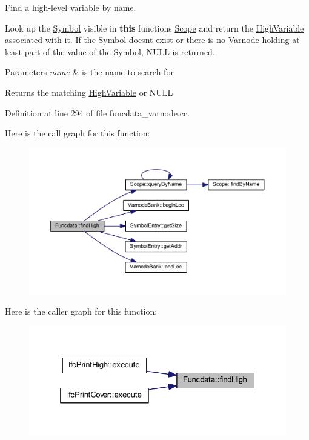 Find a high-\/level variable by name. 

Look up the \mbox{\hyperlink{class_symbol}{Symbol}} visible in {\bfseries{this}} function\textquotesingle{}s \mbox{\hyperlink{class_scope}{Scope}} and return the \mbox{\hyperlink{class_high_variable}{High\+Variable}} associated with it. If the \mbox{\hyperlink{class_symbol}{Symbol}} doesn\textquotesingle{}t exist or there is no \mbox{\hyperlink{class_varnode}{Varnode}} holding at least part of the value of the \mbox{\hyperlink{class_symbol}{Symbol}}, N\+U\+LL is returned. 
\begin{DoxyParams}{Parameters}
{\em name} & is the name to search for \\
\hline
\end{DoxyParams}
\begin{DoxyReturn}{Returns}
the matching \mbox{\hyperlink{class_high_variable}{High\+Variable}} or N\+U\+LL 
\end{DoxyReturn}


Definition at line 294 of file funcdata\+\_\+varnode.\+cc.

Here is the call graph for this function\+:
\nopagebreak
\begin{figure}[H]
\begin{center}
\leavevmode
\includegraphics[width=350pt]{class_funcdata_aa34c7b2d0d5f4cb28e0a2602d3cba033_cgraph}
\end{center}
\end{figure}
Here is the caller graph for this function\+:
\nopagebreak
\begin{figure}[H]
\begin{center}
\leavevmode
\includegraphics[width=325pt]{class_funcdata_aa34c7b2d0d5f4cb28e0a2602d3cba033_icgraph}
\end{center}
\end{figure}
\mbox{\label{class_funcdata_a9a314cd3b9e823c436ac47e356da8a39}} 
